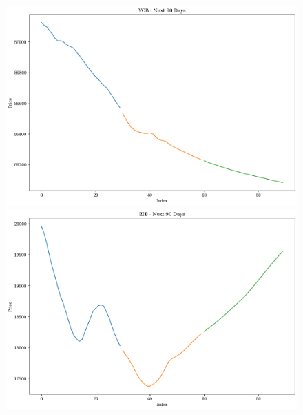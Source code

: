 \begin{figure}[H]
\begin{minipage}{0.15\textwidth}
    \end{minipage}
    \hfill
        \begin{minipage}{0.15\textwidth}
    \centering
    \includegraphics[width=1\textwidth]{resources/chapter-5/newdata1/predicted/VCB_N-HiTS_9-1_90Days.png}
    \end{minipage}
    \hfill
    \begin{minipage}{0.15\textwidth}
    \centering
    \includegraphics[width=1\textwidth]{resources/chapter-5/newdata1/predicted/EIB_N-HiTS_7-3_90Days.png}
    \end{minipage}
    \hfill
    \begin{minipage}{0.15\textwidth}
    \centering

\end{minipage}
\end{figure}
